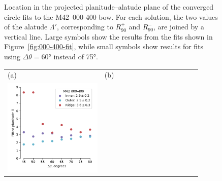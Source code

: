 \begin{figure}
\begin{tabular}{p{0.45\linewidth} p{0.45\linewidth}}
  \end{tabular}
  \caption[]{Location in the projected planitude--alatude plane of the
    converged circle fits to the M42~000-400 bow.  For each solution,
    the two values of the alatude \(\Lambda'\), corresponding to
    \(R_{90}^+\) and \(R_{90}^-\), are joined by a vertical
    line. Large symbols show the results from the fits shown in
    Figure~\ref{fig:000-400-fit}, while small symbols show results for
    fits using \(\Delta\theta = \ang{60}\) instead of \ang{75}.}
  \label{fig:000-400-planitude-alatude}
\end{figure}

\begin{figure}
  \begin{tabular}{p{0.45\linewidth} p{0.45\linewidth}}
    (a) & (b) \\
    \includegraphics[width=\linewidth]{figs/000-400-Pi-vs-Dtheta}

\end{tabular}
\end{figure}
